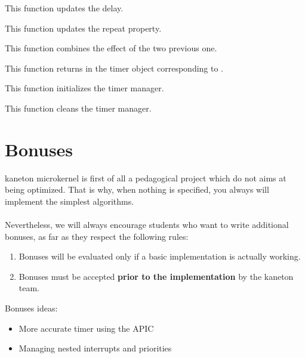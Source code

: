 	 {
	   This function updates the delay.
	 }

	 {
	   This function updates the repeat property.
	 }

	 {
	   This function combines the effect of the two previous one.
	 }

	 {
	   This function returns in  the timer object
	   corresponding to .
	 }

	 {
	   This function initializes the timer manager.
	 }

	 {
	   This function cleans the timer manager.
	 }

%
%

\newpage

\section{Bonuses}

kaneton microkernel is first of all a pedagogical project which do not
aims at being optimized. That is why, when nothing is specified, you
always will implement the simplest algorithms.\\
\\
Nevertheless, we will always encourage students who want to write
additional bonuses, as far as they respect the following rules:

\begin{enumerate}
\item Bonuses will be evaluated only if a basic implementation is
  actually working.
\item Bonuses must be accepted \textbf{prior to the implementation}
  by the kaneton team.
\end{enumerate}

Bonuses ideas:
\begin{itemize}
\item More accurate timer using the APIC
\item Managing nested interrupts and priorities
\end{itemize}

